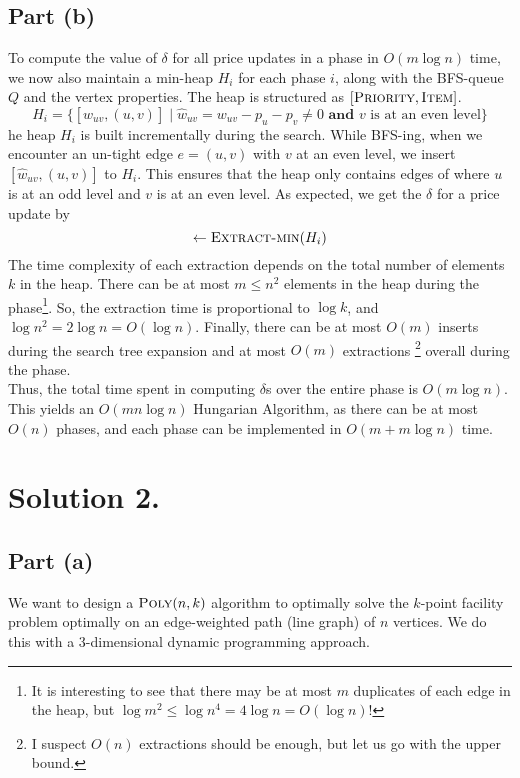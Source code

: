 \documentclass[9pt]{article}
\begin{document}
\subsection*{Part (b)}
To compute the value of $\delta$ for all price updates in a phase in $O(m \log{n})$ time,
we now also maintain a min-heap $H_{i}$ for each phase $i$, along with the BFS-queue $Q$
and the vertex properties. The heap is structured as $[\textsc{Priority}, \textsc{Item}]$.
\begin{equation}
    H_{i}= \{ [\hat{w}_{uv}, (u, v)] \mid \hat{w}_{uv} = w_{uv} - p_{u} - p_{v} \neq 0
    \textbf{ and } v \text{ is at an even level} \}
\end{equation}
he heap $H_{i}$ is built incrementally during the search. While BFS-ing, when we encounter
an un-tight edge $e = (u, v)$ with $v$ at an even level, we insert $[\hat{w}_{uv}, (u, v)]$
to $H_{i}$. This ensures that the heap only contains edges of where $u$ is at an odd level
and $v$ is at an even level. As expected, we get the $\delta$ for a price update by
\begin{equation}
    [\delta, \_] \gets \Call{Extract-min}{H_{i}}
\end{equation}
The time complexity of each extraction depends on the total number of elements $k$ in the heap.
There can be at most $m \leq n^{2}$ elements in the heap during the phase\footnote{It is
interesting to see that there may be at most $m$ duplicates of each edge in the heap, but
$\log{m^{2}} \leq \log{n^{4}} = 4 \log{n} = O(\log{n})!$}. So, the extraction time is
proportional to $\log{k}$, and $\log{n^{2}} = 2 \log{n} = O(\log{n})$. Finally, there can be
at most $O(m)$ inserts during the search tree expansion and at most $O(m)$ extractions
\footnote{I suspect $O(n)$ extractions should be enough, but let us go with the upper bound.}
overall during the phase. \\
Thus, the total time spent in computing $\delta$s over the entire phase is $O(m \log{n})$. This
yields an $O(mn \log{n})$ Hungarian Algorithm, as there can be at most $O(n)$ phases, and each
phase can be implemented in $O(m + m\log{n})$ time.

\section*{Solution 2.}
\subsection*{Part (a)}
We want to design a $\textsc{Poly}(n, k)$ algorithm to optimally solve the $k$-point facility
problem optimally on an edge-weighted path (line graph) of $n$ vertices. We do this with a
3-dimensional dynamic programming approach.
\end{document}
